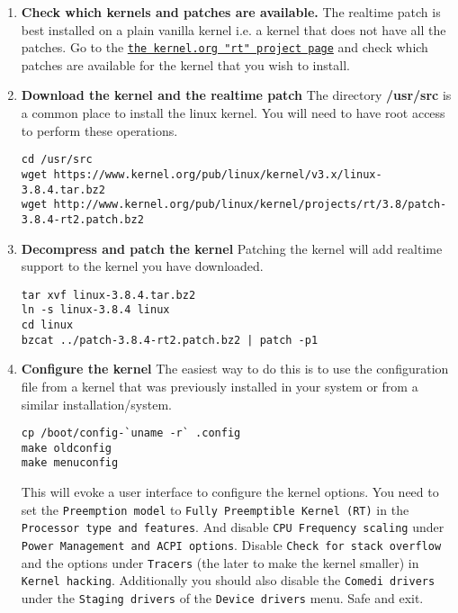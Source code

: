 \begin{enumerate}
	\item \textbf{Check which kernels and patches are available.} The realtime patch is best installed on a plain vanilla kernel i.e. a kernel that does not have all the patches.
Go to the \texttt{\href{http://www.kernel.org/pub/linux/kernel/projects/rt/}{the kernel.org "rt" project page}} and check which patches are available for the kernel that you wish to install. 

	\item \textbf{Download the kernel and the realtime patch} The directory \textbf{/usr/src} is a common place to install the linux kernel. You will need to have root access to perform these operations.
\begin{lstlisting}
cd /usr/src
wget https://www.kernel.org/pub/linux/kernel/v3.x/linux-3.8.4.tar.bz2
wget http://www.kernel.org/pub/linux/kernel/projects/rt/3.8/patch-3.8.4-rt2.patch.bz2
\end{lstlisting}

\item \textbf{Decompress and patch the kernel} Patching the kernel will add realtime support to the kernel you have downloaded.
\begin{lstlisting}
tar xvf linux-3.8.4.tar.bz2
ln -s linux-3.8.4 linux
cd linux
bzcat ../patch-3.8.4-rt2.patch.bz2 | patch -p1
\end{lstlisting}

\item \textbf{Configure the kernel} The easiest way to do this is to use the configuration file from a kernel that was previously installed in your system or from a similar installation/system.
\begin{lstlisting}
cp /boot/config-`uname -r` .config
make oldconfig
make menuconfig
\end{lstlisting}
This will evoke a user interface to configure the kernel options.
You need to set the \texttt{Preemption model} to \texttt{Fully Preemptible Kernel (RT)} in the \texttt{Processor type and features}. And disable \texttt{CPU Frequency scaling} under \texttt{Power Management and ACPI options}. Disable \texttt{Check for stack overflow} and the options under \texttt{Tracers} (the later to make the kernel smaller) in \texttt{Kernel hacking}. Additionally you should also disable the \texttt{Comedi drivers} under the \texttt{Staging drivers} of the \texttt{Device drivers} menu. Safe and exit.


\end{enumerate}

